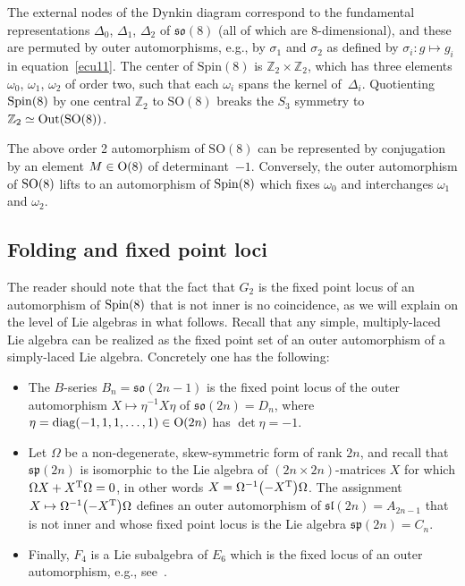 \documentclass[10pt,a4paper]{amsart}
\numberwithin{equation}{section}
\newcommand{\Z}{{\mathbb Z}}
\newcommand{\SO}{{\mathrm{SO}}}
\begin{document}
The external nodes of the Dynkin diagram correspond to the fundamental representations $\Delta_0$, $\Delta_1$, $\Delta_2$ of $\mathfrak{so}(8)$ (all of which are 8-dimensional), and these are permuted by outer automorphisms, e.g., by $\sigma_1$ and $\sigma_2$ as defined by $\sigma_i\colon g \mapsto g_i$ in equation~\eqref{ecu11}.
 The center of $\mathrm{Spin}(8)$ is $\mathbb{Z}_2\times \Z_2$, which has three elements $\omega_0$, $\omega_1$, $\omega_2$ of order two, such that each $\omega_i$ spans the kernel of~$\Delta_i$. Quotienting ${\rm Spin}(8)$ by one central $\Z_2$ to $\SO(8)$ breaks the $S_3$ symmetry to $\Z_2 \simeq {\rm Out}(\SO (8))$.

 \begin{Remark}
 The above order 2 automorphism of $\SO(8)$ can be represented by conjugation by an element $M \in {\rm O}(8)$ of determinant~$-1$. Conversely, the outer automorphism of ${\rm SO}(8)$ lifts to an automorphism of ${\rm Spin}(8)$ which fixes $\omega_0$ and interchanges $\omega_1$ and $\omega_2$.
 \end{Remark}

\subsection{Folding and fixed point loci}
 The reader should note that the fact that $G_2$ is the fixed point locus of an automorphism of ${\rm Spin}(8)$ that is not inner is no coincidence, as we will explain on the level of Lie algebras in what follows. Recall that any simple, multiply-laced Lie algebra can be realized as the fixed point set of an outer automorphism of a simply-laced Lie algebra. Concretely one has the following:
 \begin{itemize}\itemsep=0pt
 \item The $B$-series $B_n = \mathfrak{so}(2n-1)$ is the fixed point locus of the outer automorphism $X \mapsto \eta^{-1} X \eta$ of $\mathfrak{so}(2n)=D_n$, where $\eta = \operatorname{diag} (-1, 1, 1, \dots, 1) \in {\rm O}(2n)$ has $\det \eta = -1$.
 \item Let $\Omega$ be a non-degenerate, skew-symmetric form of rank $2n$, and recall that $\mathfrak{sp}(2n)$ is isomorphic to the Lie algebra of $(2n \times 2n)$-matrices $X$ for which $\Omega X + X^{\rm T} \Omega = 0$, in other words $X = \Omega^{-1} \big({-}X^{\rm T}\big) \Omega$. The assignment $X \mapsto \Omega^{-1} \big({-}X^{\rm T}\big) \Omega$ defines an outer automorphism of $\mathfrak{sl}(2n) = A_{2n-1}$ that is not inner and whose fixed point locus is the Lie algebra $\mathfrak{sp}(2n) = C_n$.
 \item Finally, $F_4$ is a Lie subalgebra of $E_6$ which is the fixed locus of an outer automorphism, e.g., see~\cite[Section~3.7]{yokota}.
 \end{itemize}
\end{document}
